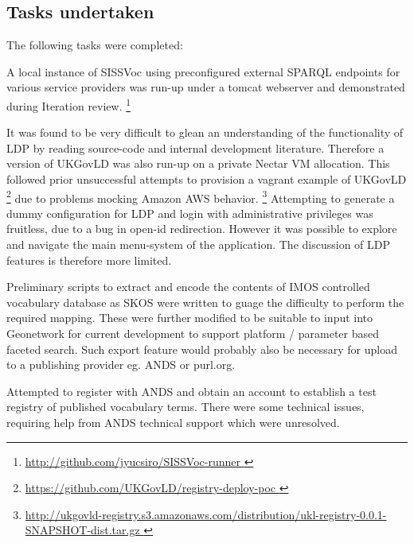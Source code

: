 \documentclass[10pt,a4paper]{article}
\begin{document}
\begin{flushleft}
\clearpage



\section{
  Tasks undertaken
}

%  


  The following tasks were completed:  

  \item[] A local instance of SISSVoc using preconfigured external SPARQL endpoints for various service providers was run-up 
  under a tomcat webserver and demonstrated during Iteration review.
  \footnote{ \url { http://github.com/jyucsiro/SISSVoc-runner }  } 

  \item[] It was found to be very difficult to glean an understanding of the functionality of LDP by reading source-code and internal 
  development literature. Therefore a version of UKGovLD was also run-up on a private Nectar VM allocation. This followed prior 
  unsuccessful attempts to provision a vagrant example of UKGovLD 
  \footnote{ \url { https://github.com/UKGovLD/registry-deploy-poc } } 
  due to problems mocking Amazon AWS behavior.  
  \footnote{ \url { 
  http://ukgovld-registry.s3.amazonaws.com/distribution/ukl-registry-0.0.1-SNAPSHOT-dist.tar.gz
  }}
%
  Attempting to generate a dummy configuration for LDP and login with administrative 
	privileges was fruitless, due to a bug in open-id redirection. However it was possible to explore and navigate the main 
  menu-system of the application.
%
  The discussion of LDP features is therefore more limited.

  \item[] 
  Preliminary scripts to extract and encode the contents of IMOS
  controlled vocabulary database as SKOS were written to guage the difficulty to perform the required mapping. These were further modified to be suitable 
  to input into Geonetwork for current development to support platform / parameter based faceted search. Such export feature would probably also be necessary for upload 
  to a publishing provider eg. ANDS or purl.org. 

  \item[] 
	Attempted to register with ANDS and obtain an account to establish a test
	registry of published vocabulary terms. There were some technical issues, requiring help from ANDS technical
	support which were unresolved.
		

\end{flushleft}
\end{document}
